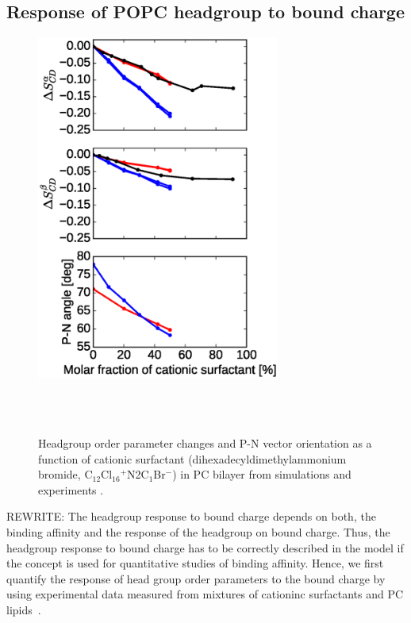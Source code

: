 \documentclass[aip,jcp,twocolumn]{revtex4}
\begin{document}
\subsection{Response of POPC headgroup to bound charge}

\begin{figure}[tbp]
  \centering
  \includegraphics[width=8.0cm]{../Fig/ipython_nb/PN_angle_OrdPars-A-B_L14-ECCL17_q80_sig89_surf.eps}
  \caption{\label{OrderParameterCHANGESsurf}
    Headgroup order parameter changes and P-N vector orientation as a function of
    cationic surfactant (dihexadecyldimethylammonium bromide, C$_{12}$Cl$_{16}$$^+$N2C$_1$Br$^-$)
    in PC bilayer from simulations and experiments \cite{scherer89}.
  }
   \\
   \\
\end{figure}

REWRITE:
The headgroup response to bound charge depends on both, the
binding affinity and the response of the headgroup on bound charge.
Thus, the headgroup response to bound charge has to be correctly
described in the model if the concept is used for quantitative studies of
binding affinity. Hence, we first quantify the response of head group order
parameters to the bound charge by using experimental data measured from
mixtures of cationinc surfactants and PC lipids~\cite{scherer89}.
\end{document}
